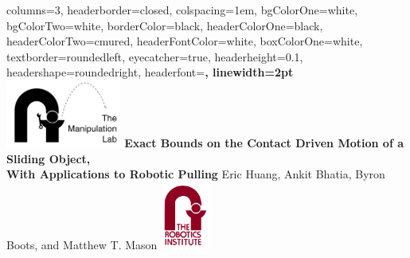 \documentclass[landscape,paperwidth=42in,paperheight=32in,margin=1.5in,fontscale = 0.32]{baposter} %
\begin{document}
\begin{poster}
{
  columns=3,
  headerborder=closed, %
  colspacing=1em, %
  bgColorOne=white, %
  bgColorTwo=white, %
  borderColor=black, %
  headerColorOne=black, %
  headerColorTwo=cmured,%
  headerFontColor=white, %
  boxColorOne=white, %
  textborder=roundedleft, %
  eyecatcher=true, %
  headerheight=0.1\textheight, %
  headershape=roundedright, %
  headerfont=\large\bf\textsc, %
  linewidth=2pt %
}
%
{\includegraphics[height=6em]{images/mlab_logo.png}} %
{\textbf{Exact Bounds on the Contact Driven Motion of a Sliding
    Object,\\\vspace{1mm} With Applications to Robotic Pulling}
  \vspace{3mm}} %
{\LARGE{{Eric Huang, Ankit Bhatia, Byron Boots, and Matthew
      T. Mason}}\vspace{3mm}} %
{\includegraphics[height=6em]{images/ri_logo.png}} %

\end{poster}
\end{document}

